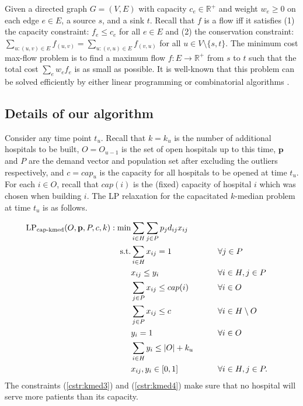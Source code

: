 Given a directed graph $G = (V, E)$ with capacity $c_e \in \mathbb{R}^+$ and weight $w_e \geq 0$ on each edge $e \in E$, a source $s$, and a sink $t$. Recall that $f$ is a flow iff it satisfies (1) the capacity constraint: $f_e \leq c_e$ for all $e \in E$ and (2) the conservation constraint: $\sum_{u:(u,v)\in E} f_{(u,v)} = \sum_{u:(v,u) \in E} f_{(v,u)}$ for all $u \in V \setminus \{s, t\}$. The minimum cost max-flow problem is to find a maximum flow $f: E \to \mathbb{R}^+$ from $s$ to $t$ such that the total cost $\sum_e w_e f_e$ is as small as possible.  It is well-known that this problem can be solved efficiently by either linear programming or combinatorial algorithms \cite{flow_book, flow_goldberg, Orlin1997}.





\subsection{Details of our algorithm}

Consider any time point $t_u$. Recall that $k = k_u$ is the number of additional hospitals to be built, $O = O_{u-1}$ is the set of open hospitals up to this time, $\mathbf{p}$ and $P$ are the demand vector and population set after excluding the outliers respectively, and $c = cap_u$ is the capacity for all hospitals to be opened at time $t_u$. For each $i \in O$, recall that $cap(i)$ is the (fixed) capacity of hospital $i$ which was chosen when building $i$. The LP relaxation for the capacitated $k$-median problem at time $t_u$ is as follows.

\begin{alignat}{2}  
  \text{LP}_{\text{cap-kmed}}(O, \mathbf{p}, P, c, k): \min  &  \sum_{i \in H}\sum_{j \in P} p_j d_{ij} x_{ij} \nonumber\\
    \text{s.t.} & \sum_{i \in H} x_{ij} = 1    &\qquad& \forall j \in P  \\
                             &  x_{ij} \leq y_i      && \forall i \in H, j \in P \ \\
                             & \sum_{j \in P} x_{ij} \leq cap(i)      && \forall i \in O  \label{cstr:kmed3} \\
                             & \sum_{j \in P} x_{ij} \leq c      && \forall i \in H \setminus O  \label{cstr:kmed4} \\
                             & y_i = 1    && \forall i \in O  \\
                             &  \sum_{i\in H} y_{i} \leq |O|+k_u      &&  \\
                             & x_{ij},  y_i \in [0,1]&& \forall i \in H, j \in P.\nonumber
\end{alignat}
The constraints (\ref{cstr:kmed3}) and (\ref{cstr:kmed4}) make sure that no hospital will serve more patients than its capacity. 

